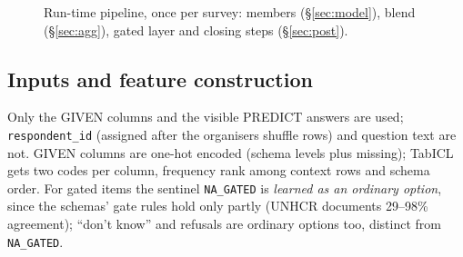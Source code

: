 \documentclass{article}
\begin{document}
\begin{figure}[h]
\centering
{}
\caption{Run-time pipeline, once per survey: members (\S\ref{sec:model}), blend (\S\ref{sec:agg}), gated layer and closing steps (\S\ref{sec:post}).}
\label{fig:pipeline}
\end{figure}

\subsection{Inputs and feature construction}
Only the GIVEN columns and the visible PREDICT answers are used; \texttt{respondent\_id} (assigned after the organisers shuffle rows) and question text are not. GIVEN columns are one-hot encoded (schema levels plus missing); TabICL gets two codes per column, frequency rank among context rows and schema order. For gated items the sentinel \texttt{NA\_GATED} is \emph{learned as an ordinary option}, since the schemas' gate rules hold only partly (UNHCR documents 29--98\% agreement); ``don't know'' and refusals are ordinary options too, distinct from \texttt{NA\_GATED}.
\end{document}
